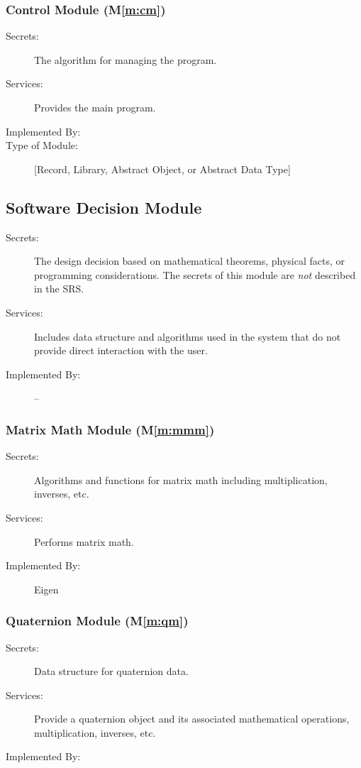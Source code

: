 \documentclass[12pt, titlepage]{article}
\newcommand{\mref}[1]{M\ref{#1}}
\begin{document}
\subsubsection{Control Module (\mref{m:cm})}

\begin{description}
\item[Secrets:] The algorithm for managing the program.
\item[Services:] Provides the main program.
\item[Implemented By:] \progname
\item[Type of Module:] [Record, Library, Abstract Object, or Abstract Data Type]
\end{description}

\subsection{Software Decision Module}

\begin{description}
\item[Secrets:] The design decision based on mathematical theorems, physical facts, or programming
  considerations. The secrets of this module are \emph{not} described in the SRS.
\item[Services:] Includes data structure and algorithms used in the system that do not provide
  direct interaction with the user.
\item[Implemented By:] --
\end{description}

\subsubsection{Matrix Math Module (\mref{m:mmm})}
\begin{description}
  \item[Secrets:] Algorithms and functions for matrix math including multiplication, inverses, etc.
  \item[Services:] Performs matrix math.
  \item[Implemented By:] Eigen \citep{eigenweb}
\end{description}

\subsubsection{Quaternion Module (\mref{m:qm})}
\begin{description}
  \item[Secrets:] Data structure for quaternion data.
  \item[Services:] Provide a quaternion object and its associated mathematical operations, multiplication, inverses, etc.
  \item[Implemented By:] \progname
\end{description}
\end{document}
